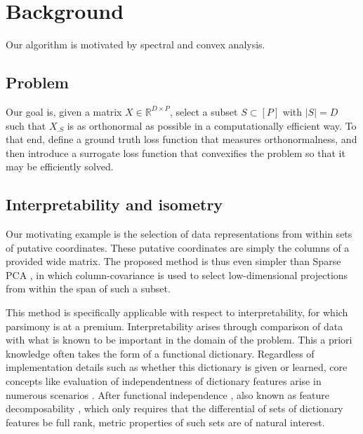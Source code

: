 \section{Background}

Our algorithm is motivated by spectral and convex analysis.

\subsection{Problem}

Our goal is, given a matrix $ X \in \mathbb R^{D \times P}$, select a subset $ S \subset [P]$ with $| S| = D$ such that $X_{.  S}$ is as orthonormal as possible in a computationally efficient way.
To that end, define a ground truth loss function that measures orthonormalness, and then introduce a surrogate loss function that convexifies the problem so that it may be efficiently solved.

\subsection{Interpretability and isometry}

Our motivating example is the selection of data representations from within sets of putative coordinates.
These putative coordinates are simply the columns of a provided wide matrix.
The proposed method is thus even simpler than Sparse PCA \citep{Dey2017-mx, Bertsimas2022-qo, Bertsimas2022-dv}, in which column-covariance is used to select low-dimensional projections from within the span of such a subset.

This method is specifically applicable with respect to interpretability, for which parsimony is at a premium.
Interpretability arises through comparison of data with what is known to be important in the domain of the problem.
This a priori knowledge often takes the form of a functional dictionary.
Regardless of implementation details such as whether this dictionary is given or learned, core concepts like evaluation of independentness of dictionary features arise in numerous scenarios \citep{Chen2019-km, Koelle2022-ju, He2023-ch}.
After functional independence \citep{Koelle2022-ju}, also known as feature decomposability \citep{templeton2024scaling}, which only requires that the differential of sets of dictionary features be full rank, metric properties of such sets are of natural interest.

